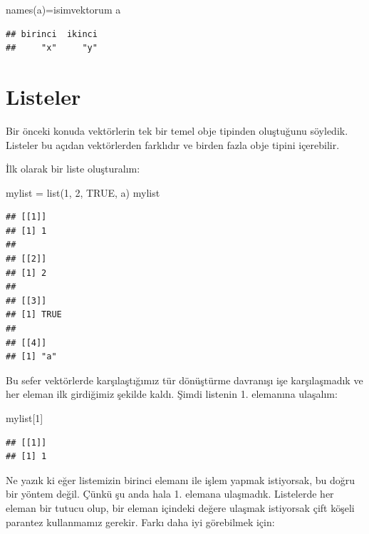 \documentclass[
]{book}
\newenvironment{Shaded}{\begin{snugshade}}{\end{snugshade}}
\newcommand{\ConstantTok}[1]{\textcolor[rgb]{0.00,0.00,0.00}{#1}}
\newcommand{\DecValTok}[1]{\textcolor[rgb]{0.00,0.00,0.81}{#1}}
\newcommand{\FunctionTok}[1]{\textcolor[rgb]{0.00,0.00,0.00}{#1}}
\newcommand{\NormalTok}[1]{#1}
\newcommand{\OtherTok}[1]{\textcolor[rgb]{0.56,0.35,0.01}{#1}}
\newcommand{\StringTok}[1]{\textcolor[rgb]{0.31,0.60,0.02}{#1}}
\begin{document}
\begin{Shaded}
\begin{Highlighting}[]
\FunctionTok{names}\NormalTok{(a)}\OtherTok{=}\NormalTok{isimvektorum}
\NormalTok{a}
\end{Highlighting}
\end{Shaded}

\begin{verbatim}
## birinci  ikinci 
##     "x"     "y"
\end{verbatim}

\hypertarget{listeler}{%
\chapter{Listeler}\label{listeler}}

Bir önceki konuda vektörlerin tek bir temel obje tipinden oluştuğunu söyledik. Listeler bu açıdan vektörlerden farklıdır ve birden fazla obje tipini içerebilir.

İlk olarak bir liste oluşturalım:

\begin{Shaded}
\begin{Highlighting}[]
\NormalTok{mylist }\OtherTok{=} \FunctionTok{list}\NormalTok{(}\DecValTok{1}\NormalTok{, }\DecValTok{2}\NormalTok{, }\ConstantTok{TRUE}\NormalTok{, }\StringTok{\textquotesingle{}a\textquotesingle{}}\NormalTok{)}
\NormalTok{mylist}
\end{Highlighting}
\end{Shaded}

\begin{verbatim}
## [[1]]
## [1] 1
## 
## [[2]]
## [1] 2
## 
## [[3]]
## [1] TRUE
## 
## [[4]]
## [1] "a"
\end{verbatim}

Bu sefer vektörlerde karşılaştığımız tür dönüştürme davranışı işe karşılaşmadık ve her eleman ilk girdiğimiz şekilde kaldı. Şimdi listenin 1. elemanına ulaşalım:

\begin{Shaded}
\begin{Highlighting}[]
\NormalTok{mylist[}\DecValTok{1}\NormalTok{]}
\end{Highlighting}
\end{Shaded}

\begin{verbatim}
## [[1]]
## [1] 1
\end{verbatim}

Ne yazık ki eğer listemizin birinci elemanı ile işlem yapmak istiyorsak, bu doğru bir yöntem değil. Çünkü şu anda hala 1. elemana ulaşmadık. Listelerde her eleman bir tutucu olup, bir eleman içindeki değere ulaşmak istiyorsak çift köşeli parantez kullanmamız gerekir. Farkı daha iyi görebilmek için:
\end{document}
